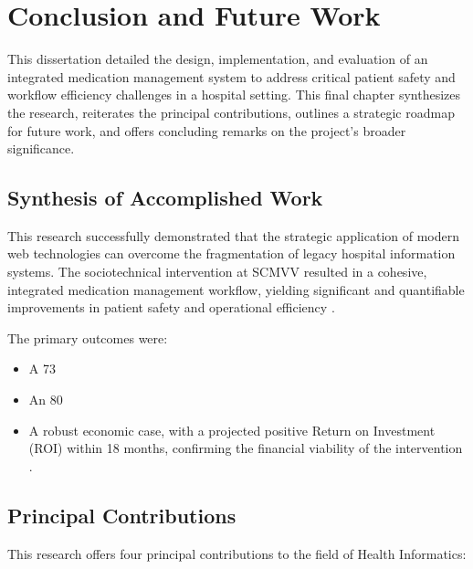 \chapter{Conclusion and Future Work}

This dissertation detailed the design, implementation, and evaluation of an integrated medication management system to address critical patient safety and workflow efficiency challenges in a hospital setting. This final chapter synthesizes the research, reiterates the principal contributions, outlines a strategic roadmap for future work, and offers concluding remarks on the project's broader significance.

\section{Synthesis of Accomplished Work}

This research successfully demonstrated that the strategic application of modern web technologies can overcome the fragmentation of legacy hospital information systems. The sociotechnical intervention at SCMVV resulted in a cohesive, integrated medication management workflow, yielding significant and quantifiable improvements in patient safety and operational efficiency \cite{ciapponi2021}.

The primary outcomes were:
\begin{itemize}
    \item A 73%
    \item An 80%
    \item A robust economic case, with a projected positive Return on Investment (ROI) within 18 months, confirming the financial viability of the intervention \cite{adler2021}.
\end{itemize}

\section{Principal Contributions}

This research offers four principal contributions to the field of Health Informatics:

